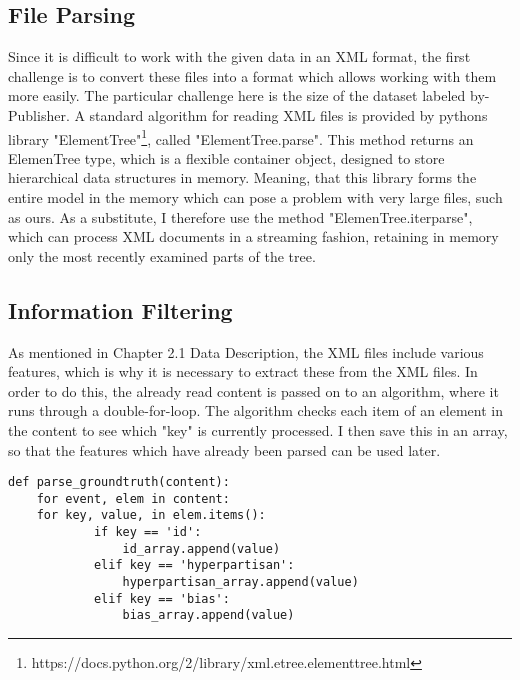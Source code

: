\documentclass[a4paper, 11pt,titlepage,oneside,openany]{book}
\begin{document}
\newpage
\subsection{File Parsing}
Since it is difficult to work with the given data in an XML format, the first challenge is to convert these files into a format which allows working with them more easily. The particular challenge here is the size of the dataset labeled by-Publisher. A standard algorithm for reading XML files is provided by pythons library "ElementTree"\footnote{https://docs.python.org/2/library/xml.etree.elementtree.html}, called "ElementTree.parse". This method returns an ElemenTree type, which is a flexible container object, designed to store hierarchical data structures in memory. Meaning, that this library forms the entire model in the memory which can pose a problem with very large files, such as ours. As a substitute, I therefore use the method "ElemenTree.iterparse", which can process XML documents in a streaming fashion, retaining in memory only the most recently examined parts of the tree. 


\subsection{Information Filtering}
As mentioned in Chapter 2.1 Data Description, the XML files include various features, which is why it is necessary to extract these from the XML files. In order to do this, the already read content is passed on to an algorithm, where it runs through a double-for-loop. The algorithm checks each item of an element in the content to see which "key" is currently processed. I then save this in an array, so that the features which have already been parsed can be used later. 

\begin{lstlisting}[caption=Parse Ground-Truth File]
def parse_groundtruth(content):
    for event, elem in content:
 	for key, value, in elem.items():
            if key == 'id':
                id_array.append(value)
            elif key == 'hyperpartisan':
                hyperpartisan_array.append(value)
            elif key == 'bias':
                bias_array.append(value)
\end{lstlisting}
\newpage 
\end{document}
